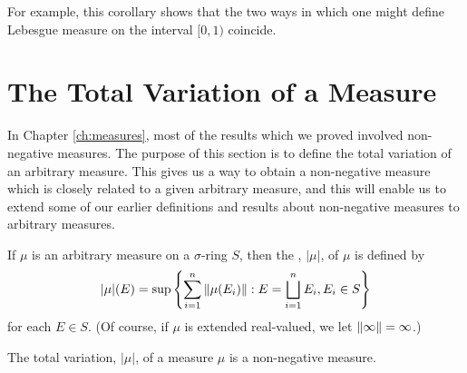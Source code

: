 For example, this corollary shows that the two ways in which one might define Lebesgue measure on the interval $[0, 1)$ coincide.

\section{The Total Variation of a Measure}

In Chapter \ref{ch:measures}, most of the results which we proved involved non-negative measures. The purpose of this section is to define the total variation of an arbitrary measure. This gives us a way to obtain a non-negative measure which is closely related to a given arbitrary measure, and this will enable us to extend some of our earlier definitions and results about non-negative measures to arbitrary measures.

\begin{definition}
If $\mu$ is an arbitrary measure on a $\sigma$-ring $S$, then the , $|\mu|$, of $\mu$ is defined by \[|\mu|(E)=\sup\left\{\sum_{i=1}^n\norm{\mu(E_i)}: E=\bigsqcup_{i=1}^nE_i, E_i\in S\right\}\] for each $E\in S$. (Of course, if $\mu$ is extended real-valued, we let $\norm{\infty}=\infty$.)
\end{definition}


\begin{theorem}\label{thm:total var is measure}
The total variation, $|\mu|$, of a measure $\mu$ is a non-negative measure.
\end{theorem}

